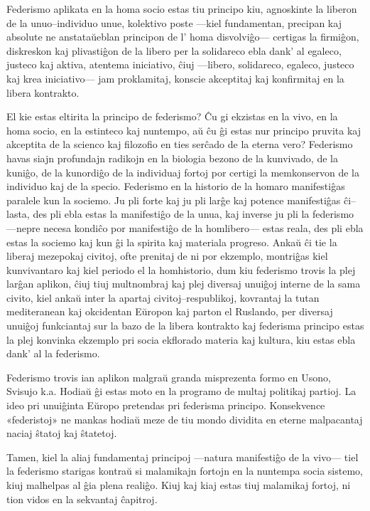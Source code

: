 Federismo aplikata en la homa socio estas tiu principo kiu, agnoskinte la liberon de la unuo–individuo unue, kolektivo poste —kiel fundamentan, precipan kaj absolute ne anstataŭeblan principon de l’ homa disvolviĝo— certigas la firmiĝon, diskreskon kaj plivastiĝon de la libero per la solidareco ebla dank’ al egaleco, justeco kaj aktiva, atentema iniciativo, ĉiuj —libero, solidareco, egaleco, justeco kaj krea iniciativo— jam proklamitaj, konscie akceptitaj kaj konfirmitaj en la libera kontrakto.

El kie estas eltirita la principo de federismo? Ĉu gi ekzistas en la vivo, en la homa socio, en la estinteco kaj nuntempo, aŭ ĉu ĝi estas nur principo pruvita kaj akceptita de la scienco kaj filozofio en ties serĉado de la eterna vero? Federismo havas siajn profundajn radikojn en la biologia bezono de la kunvivado, de la kuniĝo, de la kunordiĝo de la individuaj fortoj por certigi la memkonservon de la individuo kaj de la specio. Federismo en la historio de la homaro manifestiĝas paralele kun la sociemo. Ju pli forte kaj ju pli larĝe kaj potence manifestiĝas ĉi–lasta, des pli ebla estas la manifestiĝo de la unua, kaj inverse ju pli la federismo —nepre necesa kondiĉo por manifestiĝo de la homlibero— estas reala, des pli ebla estas la sociemo kaj kun ĝi la spirita kaj materiala progreso. Ankaŭ ĉi tie la liberaj mezepokaj civitoj, ofte prenitaj de ni por ekzemplo, montriĝas kiel kunvivantaro kaj kiel periodo el la homhistorio, dum kiu federismo trovis la plej larĝan aplikon, ĉiuj tiuj multnombraj kaj plej diversaj unuiĝoj interne de la sama civito, kiel ankaŭ inter la apartaj civitoj–respublikoj, kovrantaj la tutan mediteranean kaj okcidentan Eŭropon kaj parton el Ruslando, per diversaj unuiĝoj funkciantaj sur la bazo de la libera kontrakto kaj federisma principo estas la plej konvinka ekzemplo pri socia ekflorado materia kaj kultura, kiu estas ebla dank’ al la federismo.

Federismo trovis ian aplikon malgraŭ granda misprezenta formo en Usono, Svisujo k.a. Hodiaŭ ĝi estas moto en la programo de multaj politikaj partioj. La ideo pri unuiĝinta Eŭropo pretendas pri federisma principo. Konsekvence «federistoj» ne mankas hodiaŭ meze de tiu mondo dividita en eterne malpacantaj naciaj ŝtatoj kaj ŝtatetoj.

Tamen, kiel la aliaj fundamentaj principoj —natura manifestiĝo de la vivo— tiel la federismo starigas kontraŭ si malamikajn fortojn en la nuntempa socia sistemo, kiuj malhelpas al ĝia plena realiĝo. Kiuj kaj kiaj estas tiuj malamikaj fortoj, ni tion vidos en la sekvantaj ĉapitroj.